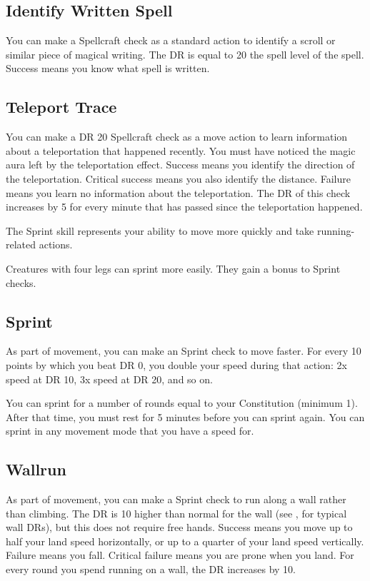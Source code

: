     \subsection{Identify Written Spell}
        You can make a Spellcraft check as a standard action to identify a scroll or similar piece of magical writing. The DR is equal to 20 \add the spell level of the spell. Success means you know what spell is written.

    \subsection{Teleport Trace}
        You can make a DR 20 Spellcraft check as a move action to learn information about a teleportation that happened recently. You must have noticed the magic aura left by the teleportation effect. Success means you identify the direction of the teleportation. Critical success means you also identify the distance. Failure means you learn no information about the teleportation. The DR of this check increases by 5 for every minute that has passed since the teleportation happened.

        The Sprint skill represents your ability to move more quickly and take running-related actions.

         Creatures with four legs can sprint more easily.
        They gain a  bonus to Sprint checks.

    \subsection{Sprint}
        As part of movement, you can make an Sprint check to move faster. For every 10 points by which you beat DR 0, you double your speed during that action: 2x speed at DR 10, 3x speed at DR 20, and so on.
        
        You can sprint for a number of rounds equal to your Constitution (minimum 1). After that time, you must rest for 5 minutes before you can sprint again. You can sprint in any movement mode that you have a speed for.

    \subsection{Wallrun}
        As part of movement, you can make a Sprint check to run along a wall rather than climbing. The DR is 10 higher than normal for the wall (see , for typical wall DRs), but this does not require free hands. Success means you move up to half your land speed horizontally, or up to a quarter of your land speed vertically. Failure means you fall. Critical failure means you are prone when you land. For every round you spend running on a wall, the DR increases by 10.

